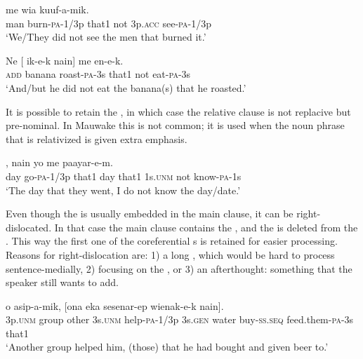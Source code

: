 \ea%
\label{ex:8:x1545}
  me  wia  kuuf-a-mik. \\
man  burn-\textsc{pa}-1/3p  that1  not  3p.\textsc{acc} see-\textsc{pa}-1/3p\\
\glt`We/They did not see the men that burned it.'
\z


\ea%
\label{ex:8:x1546}
\gll Ne  [  ik-e-k  nain]  me  en-e-k. \\
\textsc{add} banana  roast-\textsc{pa}-3s  that1  not  eat-\textsc{pa}-3s\\
\glt`And/but he did not eat the banana(s) that he roasted.'
\z


It is possible to retain the , in which case the relative clause is not replacive but pre-nominal. In Mauwake this is not common; it is used when the noun phrase that is relativized is given extra emphasis. 

\ea%
\label{ex:8:x1532}
,    nain  yo  me  paayar-e-m. \\
day  go-\textsc{pa}-1/3p  that1  day  that1  1s.\textsc{unm} not  know-\textsc{pa}-1s\\
\glt`The day that they went, I do not know the day/date.'
\z


Even though the  is usually embedded in the main clause, it can be right-dislocated. In that case the main clause contains the , and the  is deleted from the . This way the first one of the coreferential s is retained for easier processing. Reasons for right-dislocation are: 1) a long , which would be hard to process sentence-medially, 2) focusing on the , or 3) an afterthought: something that the speaker still wants to add.

\ea%
\label{ex:8:x1533}
\gll {}      o  asip-a-mik,  [ona  eka sesenar-ep  wienak-e-k  nain]. \\
3p.\textsc{unm} group  other  3s.\textsc{unm} help-\textsc{pa}-1/3p  3s.\textsc{gen} water buy-\textsc{ss}.\textsc{seq} feed.them-\textsc{pa}-3s that1\\
\glt`Another group helped him, (those) that he had bought and given beer to.'
\z


